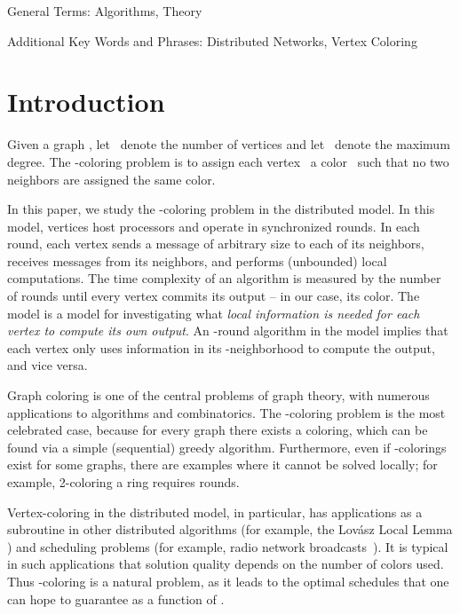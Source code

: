 \documentclass[11pt]{amsart}
\begin{document}
\medskip

\noindent General Terms: Algorithms, Theory

\medskip

\noindent Additional Key Words and Phrases: Distributed Networks, Vertex Coloring


\section{Introduction} \label{sec:Intro}
Given a graph , let~ denote the number of vertices and let~ denote the maximum degree. The -coloring problem is to assign each vertex~ a color~ such that no two neighbors are assigned the same color.

In this paper, we study the -coloring problem in the distributed  model. In this model, vertices host processors and operate in synchronized rounds. In each round, each vertex sends a message of arbitrary size to each of its neighbors, receives messages from its neighbors, and performs (unbounded) local computations. The time complexity of an algorithm is measured by the number of rounds until every vertex commits its output -- in our case, its color. The  model is a model for investigating what {\it local information is needed for each vertex to compute its own output}. An -round algorithm in the  model implies that each vertex only uses information in its -neighborhood to compute the output, and vice versa. 

Graph coloring is one of the central problems of graph theory, with numerous applications to algorithms and combinatorics. The  -coloring problem is the most celebrated case, because for every graph there exists a  coloring, which can be found via a simple (sequential) greedy algorithm. Furthermore, even if -colorings exist for some graphs, there are examples where it cannot be solved locally; for example, 2-coloring a ring requires  rounds. 

Vertex-coloring in the distributed model, in particular, has applications as a subroutine in other distributed algorithms (for example, the Lov\'{a}sz Local Lemma \cite{fischer2017sublogarithmic}) and scheduling problems (for example, radio network broadcasts~\cite{CK85, CS89, RP89, ET90}). It is typical in such applications that solution quality depends on the number of colors used. Thus -coloring is a natural problem, as it leads to the optimal schedules that one can hope to guarantee as a function of .
\end{document}
